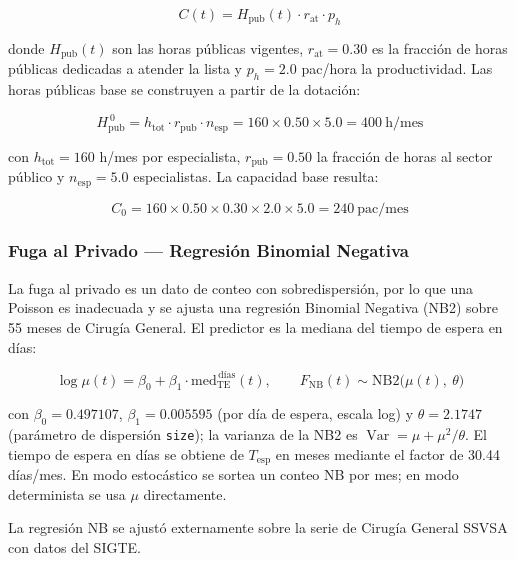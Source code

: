 \documentclass[12pt,a4paper]{article}
\begin{document}
\begin{equation}
C(t) = H_{\text{pub}}(t)\cdot r_{\text{at}}\cdot p_h
\label{eq:capacidad}
\end{equation}

donde $H_{\text{pub}}(t)$ son las horas públicas vigentes, $r_{\text{at}}=0.30$ es la fracción de horas públicas dedicadas a atender la lista y $p_h=2.0$ pac/hora la productividad. Las horas públicas base se construyen a partir de la dotación:

\begin{equation}
H_{\text{pub}}^{\,0} = h_{\text{tot}}\cdot r_{\text{pub}}\cdot n_{\text{esp}}
= 160 \times 0.50 \times 5.0 = 400 \ \text{h/mes}
\end{equation}

con $h_{\text{tot}}=160$ h/mes por especialista, $r_{\text{pub}}=0.50$ la fracción de horas al sector público y $n_{\text{esp}}=5.0$ especialistas. La capacidad base resulta:

\begin{equation}
C_0 = 160 \times 0.50 \times 0.30 \times 2.0 \times 5.0 = 240 \ \text{pac/mes}
\end{equation}

\subsubsection*{Fuga al Privado — Regresión Binomial Negativa}

La fuga al privado es un dato de conteo con sobredispersión, por lo que una Poisson es inadecuada y se ajusta una regresión Binomial Negativa (NB2) sobre 55 meses de Cirugía General. El predictor es la mediana del tiempo de espera en días:

\begin{equation}
\log \mu(t) = \beta_0 + \beta_1 \cdot \text{med}_{\text{TE}}^{\,\text{días}}(t),
\qquad
F_{\text{NB}}(t) \sim \text{NB2}\bigl(\mu(t),\ \theta\bigr)
\label{eq:nb}
\end{equation}

con $\beta_0 = 0.497107$, $\beta_1 = 0.005595$ (por día de espera, escala log) y $\theta = 2.1747$ (parámetro de dispersión \texttt{size}); la varianza de la NB2 es $\operatorname{Var}=\mu + \mu^2/\theta$. El tiempo de espera en días se obtiene de $T_{\text{esp}}$ en meses mediante el factor de 30.44 días/mes. En modo estocástico se sortea un conteo NB por mes; en modo determinista se usa $\mu$ directamente.

\begin{databox}
La regresión NB se ajustó externamente sobre la serie de Cirugía General SSVSA con datos del SIGTE.
\end{databox}
\end{document}
